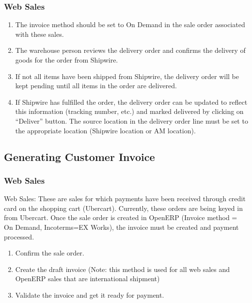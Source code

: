 \subsubsection{Web Sales}
\begin{enumerate}
\item The invoice method should be set to On Demand in the sale order associated with these sales.
\item The warehouse person reviews the delivery order and confirms the delivery of goods for the order from Shipwire.
\item If not all items have been shipped from Shipwire, the delivery order will be kept pending until all items in the order are delivered.
\item If Shipwire has fulfilled the order, the delivery order can be updated to reflect this information (tracking number, etc.) and marked delivered by clicking on “Deliver” button. The source location in the delivery order line must be set to the appropriate location (Shipwire location or AM location).
\end{enumerate}

\subsection{Generating Customer Invoice}
\subsubsection{Web Sales}
Web Sales: These are sales for which payments have been received through credit card on the shopping cart (Ubercart). Currently, these orders are being keyed in from Ubercart. Once the sale order is created in OpenERP (Invoice method = On Demand, Incoterms=EX Works), the invoice must be created and payment processed.
\begin{enumerate}
\item Confirm the sale order.
\item Create the draft invoice (Note: this method is used for all web sales and OpenERP sales that are international shipment)
\item Validate the invoice and get it ready for payment.
\end{enumerate}

